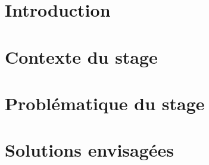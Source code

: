 \documentclass[a4paper,12pt]{article}
\begin{document}

\newpage
\tableofcontents
\section*{Introduction}

\newpage
\section{Contexte du stage}

\section{Problématique du stage}

\newpage
\section{Solutions envisagées}

\end{document}
